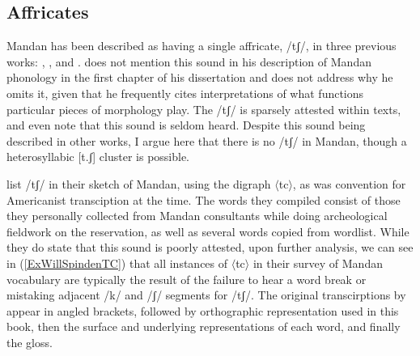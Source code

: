 \subsection{Affricates}\label{affricates}

Mandan has been described as having a single affricate, /tʃ/, in three previous works: \citet{will1906}, \citet{kennard1936}, and \citet{mixco1997a}. \citet[14]{hollow1970} does not mention this sound in his description of Mandan phonology in the first chapter of his dissertation and does not address why he omits it, given that he frequently cites  interpretations of what functions particular pieces of morphology play. The /tʃ/ is sparsely attested within  texts, and \citet[190]{will1906} even note that this sound is seldom heard. Despite this sound being described in other works, I argue here that there is no /tʃ/ in Mandan, though a heterosyllabic [t.ʃ] cluster is possible.

\citet[190]{will1906} list /tʃ/ in their sketch of Mandan, using the digraph $\langle$tc$\rangle$, as was convention for Americanist transciption at the time. The words they compiled consist of those they personally collected from Mandan consultants while doing archeological fieldwork on the reservation, as well as several words copied from  wordlist. While they do state that this sound is poorly attested, upon further analysis, we can see in (\ref{ExWillSpindenTC}) that all instances of $\langle$tc$\rangle$ in their survey of Mandan vocabulary are typically the result of the failure to hear a word break or mistaking adjacent /k/ and /ʃ/ segments for /tʃ/. The original transcirptions by \citeauthor{will1906} appear in angled brackets, followed by orthographic representation used in this book, then the surface and underlying representations of each word, and finally the gloss.

